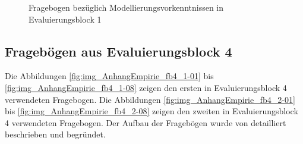 \begin{figure}[htbp]
	\centering
	\caption{Fragebogen bezüglich Modellierungsvorkenntnissen in Evaluierungsblock 1}
	\label{fig:img_AnhangEmpirie_fb1_4-01}
\end{figure}

\clearpage
\subsection{Fragebögen aus Evaluierungsblock 4}
\label{sub:fb_eval4}

Die Abbildungen \ref{fig:img_AnhangEmpirie_fb4_1-01} bis \ref{fig:img_AnhangEmpirie_fb4_1-08} zeigen den ersten in Evaluierungsblock 4 verwendeten Fragebogen. Die Abbildungen \ref{fig:img_AnhangEmpirie_fb4_2-01} bis \ref{fig:img_AnhangEmpirie_fb4_2-08} zeigen den zweiten in Evaluierungsblock 4 verwendeten Fragebogen. Der Aufbau der Fragebögen wurde von \citet{Wahlmuller10} detailliert beschrieben und begründet.

